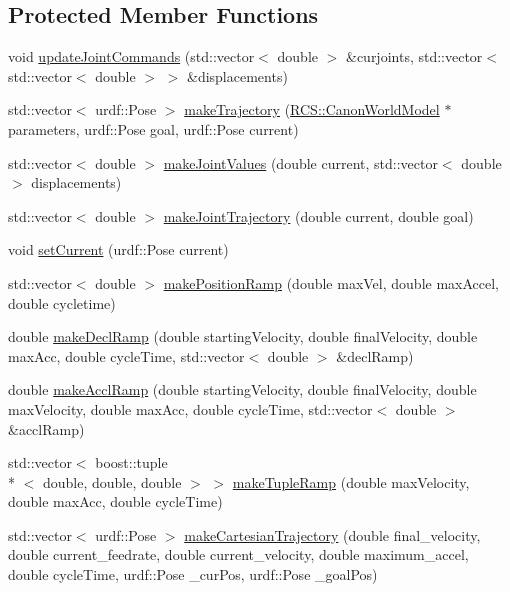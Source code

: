 \subsection*{Protected Member Functions}
\begin{DoxyCompactItemize}
\item 
void \hyperlink{classTrajectoryMaker_a59aedc924ba9fe197779bdd7c53ae97d}{update\-Joint\-Commands} (std\-::vector$<$ double $>$ \&curjoints, std\-::vector$<$ std\-::vector$<$ double $>$ $>$ \&displacements)
\item 
std\-::vector$<$ urdf\-::\-Pose $>$ \hyperlink{classTrajectoryMaker_a84f493a10a49376b0447139bd6aa7a1c}{make\-Trajectory} (\hyperlink{structRCS_1_1CanonWorldModel}{R\-C\-S\-::\-Canon\-World\-Model} $\ast$parameters, urdf\-::\-Pose goal, urdf\-::\-Pose current)
\item 
std\-::vector$<$ double $>$ \hyperlink{classTrajectoryMaker_a370d90dc48e1c3c864d669769ba38992}{make\-Joint\-Values} (double current, std\-::vector$<$ double $>$ displacements)
\item 
std\-::vector$<$ double $>$ \hyperlink{classTrajectoryMaker_aaf2b93827e39641e71c62cf7eb07623a}{make\-Joint\-Trajectory} (double current, double goal)
\item 
void \hyperlink{classTrajectoryMaker_a367e99ca3603eecbb2b601b699cf4c82}{set\-Current} (urdf\-::\-Pose current)
\item 
std\-::vector$<$ double $>$ \hyperlink{classTrajectoryMaker_ace8cc94b4579d784f19590c3bda77366}{make\-Position\-Ramp} (double max\-Vel, double max\-Accel, double cycletime)
\item 
double \hyperlink{classTrajectoryMaker_a6fb1afa338679f6251c5c557d985a41e}{make\-Decl\-Ramp} (double starting\-Velocity, double final\-Velocity, double max\-Acc, double cycle\-Time, std\-::vector$<$ double $>$ \&decl\-Ramp)
\item 
double \hyperlink{classTrajectoryMaker_a192ba138d9d818e58c0f6e9806f407d8}{make\-Accl\-Ramp} (double starting\-Velocity, double final\-Velocity, double max\-Velocity, double max\-Acc, double cycle\-Time, std\-::vector$<$ double $>$ \&accl\-Ramp)
\item 
std\-::vector$<$ boost\-::tuple\\*
$<$ double, double, double $>$ $>$ \hyperlink{classTrajectoryMaker_ac62b743efeb6bf7e0cb63d13423ca352}{make\-Tuple\-Ramp} (double max\-Velocity, double max\-Acc, double cycle\-Time)
\item 
std\-::vector$<$ urdf\-::\-Pose $>$ \hyperlink{classTrajectoryMaker_aa6f2007f0074a68be1244e8f8cd23a1d}{make\-Cartesian\-Trajectory} (double final\-\_\-velocity, double current\-\_\-feedrate, double current\-\_\-velocity, double maximum\-\_\-accel, double cycle\-Time, urdf\-::\-Pose \-\_\-cur\-Pos, urdf\-::\-Pose \-\_\-goal\-Pos)

\end{DoxyCompactItemize}
